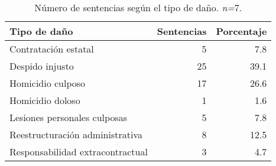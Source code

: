 \begin{table}[H]
\centering
\caption{Número de sentencias según el tipo de daño. \textit{n=}7.} 
\label{tab:dano}
\begin{tabular}{lrr}
  \hline
Tipo de daño & Sentencias & Porcentaje \\ 
  \hline
Contratación estatal &  5 & 7.8 \\ 
  Despido injusto & 25 & 39.1 \\ 
  Homicidio culposo & 17 & 26.6 \\ 
  Homicidio doloso &  1 & 1.6 \\ 
  Lesiones personales culposas &  5 & 7.8 \\ 
  Reestructuración administrativa &  8 & 12.5 \\ 
  Responsabilidad extracontractual &  3 & 4.7 \\ 
   \hline
\end{tabular}
\end{table}
